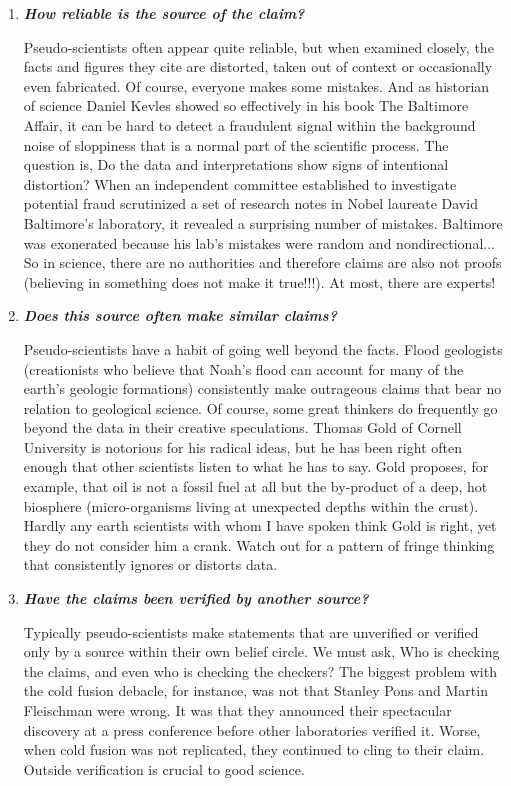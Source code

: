 	\begin{enumerate}[label=\protect\circledbullet{\arabic*},leftmargin=15mm]
		\item \textit{\textbf{How reliable is the source of the claim?}}

		Pseudo-scientists often appear quite reliable, but when examined closely, the facts and figures they cite are distorted, taken out of context or occasionally even fabricated. Of course, everyone makes some mistakes. And as historian of science Daniel Kevles showed so effectively in his book The Baltimore Affair, it can be hard to detect a fraudulent signal within the background noise of sloppiness that is a normal part of the scientific process. The question is, Do the data and interpretations show signs of intentional distortion? When an independent committee established to investigate potential fraud scrutinized a set of research notes in Nobel laureate David Baltimore's laboratory, it revealed a surprising number of mistakes. Baltimore was exonerated because his lab's mistakes were random and nondirectional... So in science, there are no authorities and therefore claims are also not proofs (believing in something does not make it true!!!). At most, there are experts!

		\item \textit{\textbf{Does this source often make similar claims?}}

		Pseudo-scientists have a habit of going well beyond the facts. Flood geologists (creationists who believe that Noah's flood can account for many of the earth's geologic formations) consistently make outrageous claims that bear no relation to geological science. Of course, some great thinkers do frequently go beyond the data in their creative speculations. Thomas Gold of Cornell University is notorious for his radical ideas, but he has been right often enough that other scientists listen to what he has to say. Gold proposes, for example, that oil is not a fossil fuel at all but the by-product of a deep, hot biosphere (micro-organisms living at unexpected depths within the crust). Hardly any earth scientists with whom I have spoken think Gold is right, yet they do not consider him a crank. Watch out for a pattern of fringe thinking that consistently ignores or distorts data.

		\item \textit{\textbf{Have the claims been verified by another source?}}

		Typically pseudo-scientists make statements that are unverified or verified only by a source within their own belief circle. We must ask, Who is checking the claims, and even who is checking the checkers? The biggest problem with the cold fusion debacle, for instance, was not that Stanley Pons and Martin Fleischman were wrong. It was that they announced their  spectacular discovery at a press conference before other laboratories verified it. Worse, when cold fusion was not replicated, they continued to cling to their claim. Outside verification is crucial to good science.


\end{enumerate}
